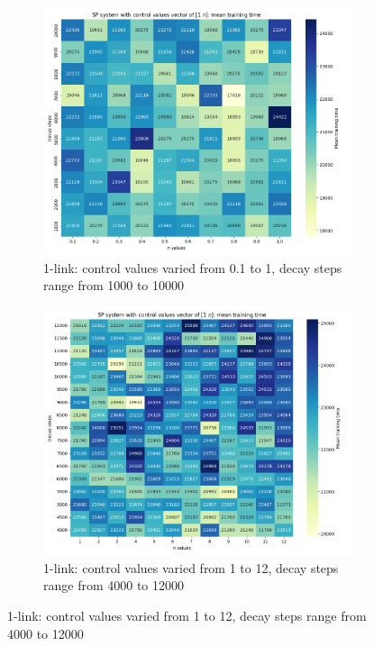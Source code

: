 \begin{figure}[h!]
	\centering
	\begin{subfigure}[t]{0.48\textwidth}
		\centering
		\includegraphics[width=\textwidth]{Figures/SP_cv_01_to_1.png}
		\caption{1-link: control values varied from 0.1 to 1, decay steps range from 1000 to 10000}
	\end{subfigure}
	\begin{subfigure}[t]{0.48\textwidth}
		\centering
		\includegraphics[width=\textwidth]{Figures/SP_cv_1_to_12.png}
		\caption{1-link: control values varied from 1 to 12, decay steps range from 4000 to 12000}

\end{subfigure}
\end{figure}
